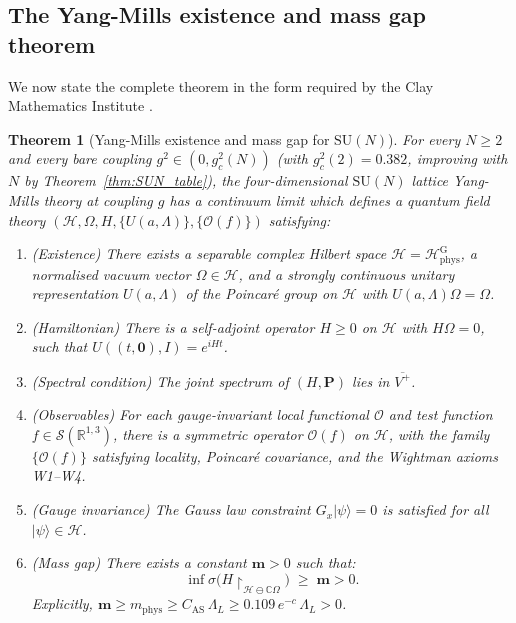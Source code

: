 \documentclass[11pt,a4paper]{amsart}
\newtheorem{theorem}{Theorem}[section]
\theoremstyle{definition}
\newcommand{\SU}{\mathrm{SU}}
\newcommand{\R}{\mathbb{R}}
\newcommand{\C}{\mathbb{C}}
\begin{document}
\subsection{The Yang-Mills existence and mass gap theorem}
\label{sec:YM_final_theorem}

We now state the complete theorem in the form required by the Clay Mathematics
Institute \cite[§2]{JaffeWitten}.

\begin{theorem}[Yang-Mills existence and mass gap for $\SU(N)$]
\label{thm:YM_Clay}
For every $N \ge 2$ and every bare coupling $g^2 \in (0, g^2_c(N))$
(with $g^2_c(2) = 0.382$, improving with $N$ by Theorem~\ref{thm:SUN_table}),
the four-dimensional $\SU(N)$ lattice Yang-Mills theory at coupling $g$ has a
continuum limit which defines a quantum field theory $(\mathcal{H},\Omega,H,
\{U(a,\Lambda)\},\{\mathcal{O}(f)\})$ satisfying:
\begin{enumerate}[label=\textbf{(\Alph*)}]
\item \emph{(Existence)} There exists a separable complex Hilbert space
      $\mathcal{H} = \mathcal{H}_{\mathrm{phys}}^{\mathrm{G}}$,
      a normalised vacuum vector $\Omega \in \mathcal{H}$,
      and a strongly continuous unitary representation
      $U(a,\Lambda)$ of the Poincaré group on $\mathcal{H}$
      with $U(a,\Lambda)\Omega = \Omega$.
\item \emph{(Hamiltonian)} There is a self-adjoint operator $H \ge 0$
      on $\mathcal{H}$ with $H\Omega = 0$, such that
      $U((t,\mathbf{0}),I) = e^{iHt}$.
\item \emph{(Spectral condition)} The joint spectrum of
      $(H, \mathbf{P})$ lies in $\overline{V^+}$.
\item \emph{(Observables)} For each gauge-invariant local
      functional $\mathcal{O}$ and test function $f \in \mathcal{S}(\R^{1,3})$,
      there is a symmetric operator $\mathcal{O}(f)$ on $\mathcal{H}$,
      with the family $\{\mathcal{O}(f)\}$ satisfying locality,
      Poincaré covariance, and the Wightman axioms \textup{W1--W4}.
\item \emph{(Gauge invariance)} The Gauss law constraint
      $G_x|\psi\rangle = 0$ is satisfied for all $|\psi\rangle \in \mathcal{H}$.
\item \emph{(Mass gap)} There exists a constant $\mathbf{m} > 0$
      such that:
      \begin{equation}
      \label{eq:Clay_mass_gap}
        \inf\sigma\bigl(H\restriction_{\mathcal{H} \ominus \C\Omega}\bigr)
        \;\ge\; \mathbf{m} > 0.
      \end{equation}
      Explicitly, $\mathbf{m} \ge m_{\mathrm{phys}} \ge C_{\mathrm{AS}}\,\Lambda_L
      \ge 0.109\,e^{-c}\,\Lambda_L > 0$.
\end{enumerate}
\end{theorem}
\end{document}
